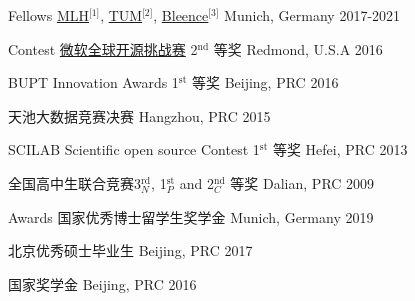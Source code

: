 




\begin{cvhonors}


\cvhonor
{Fellows} %
{\href{https://fellowship.mlh.io/}{MLH}$^{\text{[1]}}$, \href{}{TUM}$^{\text{[2]}}$,  \href{https://bleenco.com/}{Bleence}$^{\text{[3]}}$} %
{Munich, Germany} %
{2017-2021} %


\cvhonor
{Contest} %
{\href{https://www.microsoft.com/en-us/research/academic-program/microsoft-open-source-challenge/}{微软全球开源挑战赛} 2$^\text{nd}$ 等奖} %
{Redmond, U.S.A} %
{2016} %

\cvhonor
{} %
{BUPT Innovation Awards 1$^\text{st}$ 等奖} %
{Beijing, PRC} %
{2016} %

\cvhonor
{} %
{天池大数据竞赛决赛} %
{Hangzhou, PRC} %
{2015} %


\cvhonor
{} %
{SCILAB Scientific open source Contest 1$^\text{st}$ 等奖} %
{Hefei, PRC} %
{2013} %


\cvhonor
{} %
{全国高中生联合竞赛3$^\text{rd}_N$, 1$^\text{st}_P$ and 2$^\text{nd}_C$ 等奖} %
{Dalian, PRC} %
{2009} %

\cvhonor
{Awards} %
{国家优秀博士留学生奖学金} %
{Munich, Germany} %
{2019} %

\cvhonor
{} %
{北京优秀硕士毕业生} %
{Beijing, PRC} %
{2017} %

\cvhonor
{} %
{国家奖学金} %
{Beijing, PRC} %
{2016} %


\end{cvhonors}
